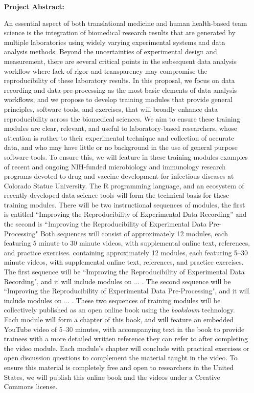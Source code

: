 \documentclass[pdftex,english,11.5pt,parskip=half]{scrartcl}
\begin{document}
\def\bf{\normalfont\bfseries}
\pagestyle{empty}

{\large \textbf{Project Abstract:}}


An essential aspect of both translational medicine and human 
health-based team science is the integration of biomedical research 
results that are generated by multiple laboratories using widely varying 
experimental systems and data analysis methods. Beyond the uncertainties of 
experimental design and measurement, there are several critical points in 
the subsequent data analysis workflow where lack of rigor and transparency 
may compromise the reproducibility of these laboratory results.  In this proposal, 
we focus on data recording and data pre-processing as the most basic elements 
of data analysis workflows, and we propose to develop training modules that 
provide general principles, software tools, and exercises, that will broadly 
enhance data reproducibility across the biomedical sciences. We aim to
ensure these training modules are clear, relevant, and useful to laboratory-based 
researchers, whose attention is rather to their experimental technique and collection 
of accurate data, and who may have little or no background in the use of general 
purpose software tools.  To ensure this, we will feature in these training modules 
examples of recent and ongoing NIH-funded microbiology and immunology research 
programs devoted to drug and vaccine development for infectious diseases at 
Colorado Statue University. The R programming language, and an ecosystem of
recently developed data science tools will form the technical basis for these
training modules.  There will be two instructional sequences of modules, the first
is entitled  ``Improving the Reproducibility of Experimental Data Recording'' 
and the second is ``Improving the Reproducibility of Experimental Data Pre-Processing"
Both sequences will consist of approximately 12 modules, each featuring 5 minute
to 30 minute videos, with supplemental online text, references, and practice exercises.
containing approximately 12 modules, each featuring 5--30 minute videos, with
supplemental online text, references, and practice exercises. The first sequence
will be ``Improving the Reproducibility of Experimental Data Recording", and it
will include modules on ... . The second sequence will be ``Improving the
Reproducibility of Experimental Data Pre-Processing", and it will include
modules on ... . These two sequences of training modules will be collectively
published as an open online book using the \textit{bookdown} technology. Each
module will form a chapter of this book, and will feature an embedded YouTube
video of 5--30 minutes, with accompanying text in the book to provide trainees
with a more detailed written reference they can refer to after completing the
video module.  Each module's chapter will conclude with practical exercises or
open discussion questions to complement the material taught in the video. To
ensure this material is completely free and open to researchers in the United
States, we will publish this online book and the videos under a Creative Commons
license.
\end{document}
